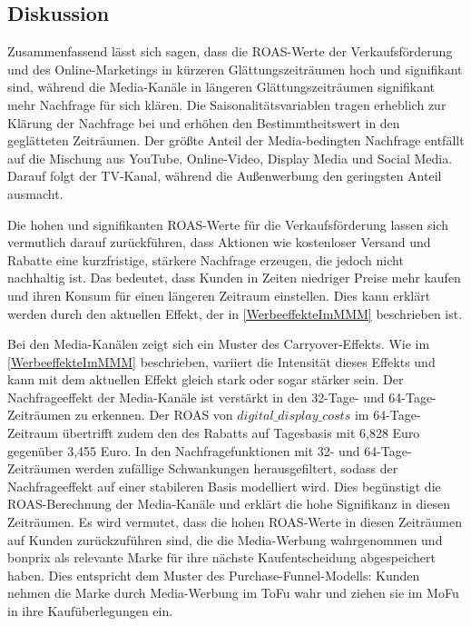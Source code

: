 \subsection{Diskussion}
\label{diskussion}
Zusammenfassend lässt sich sagen, dass die \ac{ROAS}-Werte der Verkaufsförderung und des Online-Marketings in kürzeren Glättungszeiträumen hoch und signifikant sind, während die Media-Kanäle in längeren Glättungszeiträumen signifikant mehr Nachfrage für sich klären. Die Saisonalitätsvariablen tragen erheblich zur Klärung der Nachfrage bei und erhöhen den Bestimmtheitswert in den geglätteten Zeiträumen. Der größte Anteil der Media-bedingten Nachfrage entfällt auf die Mischung aus YouTube, Online-Video, Display Media und Social Media. Darauf folgt der TV-Kanal, während die Außenwerbung den geringsten Anteil ausmacht. \par
Die hohen und signifikanten \ac{ROAS}-Werte für die Verkaufsförderung lassen sich vermutlich darauf zurückführen, dass Aktionen wie kostenloser Versand und Rabatte eine kurzfristige, stärkere Nachfrage erzeugen, die jedoch nicht nachhaltig ist. Das bedeutet, dass Kunden in Zeiten niedriger Preise mehr kaufen und ihren Konsum für einen längeren Zeitraum einstellen. Dies kann erklärt werden durch den aktuellen Effekt, der in \autoref{WerbeeffekteImMMM} beschrieben ist. \par
Bei den Media-Kanälen zeigt sich ein Muster des Carryover-Effekts. Wie im \autoref{WerbeeffekteImMMM} beschrieben, variiert die Intensität dieses Effekts und kann mit dem aktuellen Effekt gleich stark oder sogar stärker sein. Der Nachfrageeffekt der Media-Kanäle ist verstärkt in den 32-Tage- und 64-Tage-Zeiträumen zu erkennen. Der \ac{ROAS} von \(digital\_display\_costs\) im 64-Tage-Zeitraum übertrifft zudem den des Rabatts auf Tagesbasis mit 6,828 Euro gegenüber 3,455 Euro. In den Nachfragefunktionen mit 32- und 64-Tage-Zeiträumen werden zufällige Schwankungen herausgefiltert, sodass der Nachfrageeffekt auf einer stabileren Basis modelliert wird. Dies begünstigt die \ac{ROAS}-Berechnung der Media-Kanäle und erklärt die hohe Signifikanz in diesen Zeiträumen. Es wird vermutet, dass die hohen \ac{ROAS}-Werte in diesen Zeiträumen auf Kunden zurückzuführen sind, die die Media-Werbung wahrgenommen und bonprix als relevante Marke für ihre nächste Kaufentscheidung abgespeichert haben. Dies entspricht dem Muster des Purchase-Funnel-Modells: Kunden nehmen die Marke durch Media-Werbung im \ac{ToFu} wahr und ziehen sie im \ac{MoFu} in ihre Kaufüberlegungen ein. \par

